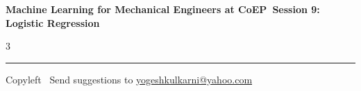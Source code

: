 \documentclass[8pt,landscape]{article}
\begin{document}
\footnotesize

\begin{center}
\Large{\textbf{Machine Learning for Mechanical Engineers at CoEP\ Session 9: Logistic Regression}}
\end{center}

\begin{multicols}{3}

\end{multicols}

\rule{\linewidth}{0.25pt}
\scriptsize
Copyleft \textcopyleft\  Send suggestions to
\href{http://www.yogeshkulkarni.com}{yogeshkulkarni@yahoo.com}
\end{document}
